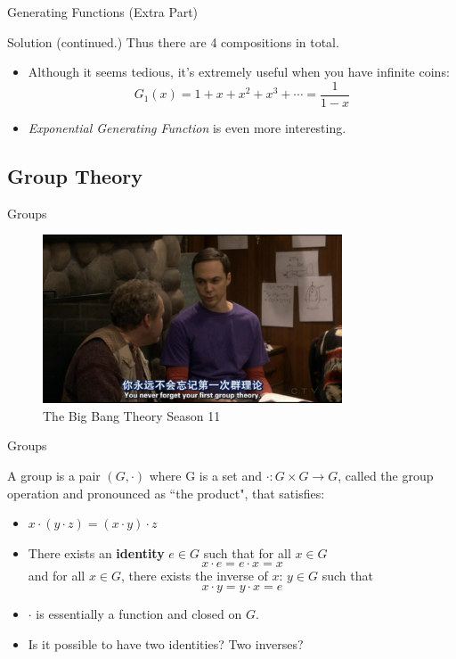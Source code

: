 \begin{frame}{Generating Functions (Extra Part)}
    \begin{block}{Solution (continued.)}
        Thus there are 4 compositions in total.
    \end{block}
    \begin{itemize}
        \item Although it seems tedious, it's extremely useful when you have infinite coins: $$G_1(x)=1+x+x^2+x^3+\cdots=\frac{1}{1-x}$$
        \item \emph{Exponential Generating Function} is even more interesting.
    \end{itemize}
\end{frame}

\subsection{Group Theory}
\outline
\begin{frame}{Groups}
    \begin{figure}
        \centering
        \includegraphics[width=3.5in]{../images/tbbt}
        \caption{The Big Bang Theory Season 11}
    \end{figure}
\end{frame}
\begin{frame}{Groups}
    \begin{definition}
        A group is a pair $(G,\cdot)$ where G is a set and $\cdot: G\times G \to G$, called the group operation and pronounced as “the product", that satisfies:
        \begin{itemize}
            \item $x\cdot(y\cdot z)=(x\cdot y)\cdot z$
            \item There exists an \textbf{identity} $e\in G$ such that for all $x\in G$ $$x\cdot e=e\cdot x=x$$ and for all $x\in G$, there exists the inverse of $x$: $y\in G$ such that $$x\cdot y=y\cdot x=e$$
        \end{itemize}
    \end{definition}
    \begin{itemize}
        \item $\cdot$ is essentially a function and closed on $G$.
        \item Is it possible to have two identities? Two inverses? 
    \end{itemize}
\end{frame}

